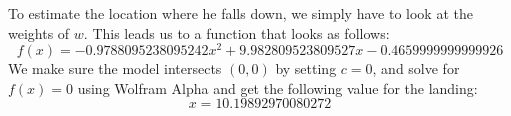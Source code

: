 To estimate the location where he falls down, we simply have to look at the weights of $w$. This leads us to a function that looks as follows:
$$
f(x) =-0.9788095238095242x^2 + 9.982809523809527x -0.4659999999999926
$$
We make sure the model intersects $(0,0)$ by setting $c = 0$, and solve for $f(x) = 0$ using Wolfram Alpha and get the following value for the landing: 
$$
x = 10.19892970080272
$$